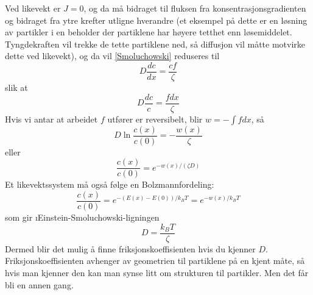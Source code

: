 \noindent Ved likevekt er $J=0$, og da må bidraget til fluksen fra konsentrasjonsgradienten og bidraget fra ytre krefter utligne hverandre (et eksempel på dette er en løsning av partikler i en beholder der partiklene har høyere tetthet enn løsemiddelet. Tyngdekraften vil trekke de tette partiklene ned, så diffusjon vil måtte motvirke dette ved likevekt), og da vil \eqref{Smoluchowski} reduseres til
\begin{equation}
	D\frac{dc}{dx}=\frac{cf}{\zeta}
\end{equation}
slik at
\begin{equation}
	D\frac{dc}{c}=\frac{fdx}{\zeta}
\end{equation}
Hvis vi antar at arbeidet $f$ utfører er reversibelt, blir $w=-\int fdx$, så
\begin{equation}
	D\ln\frac{c(x)}{c(0)}=-\frac{w(x)}{\zeta}
\end{equation}
eller
\begin{equation}
	\frac{c(x)}{c(0)}=e^{-w(x)/(\zeta D)}
\end{equation}
Et likevektssystem må også følge en Bolzmannfordeling:
\begin{equation}
	\frac{c(x)}{c(0)}=e^{-(E(x)-E(0))/k_BT}=e^{-w(x)/k_BT}
\end{equation}
som gir \i{Einstein-Smoluchowski-ligningen}
\begin{equation}
	D=\frac{k_BT}{\zeta}
\end{equation}
Dermed blir det mulig å finne friksjonskoeffisienten hvis du kjenner $D$. Friksjonskoeffisienten avhenger av geometrien til partiklene på en kjent måte, så hvis man kjenner den kan man synse litt om strukturen til partikler. Men det får bli en annen gang.

